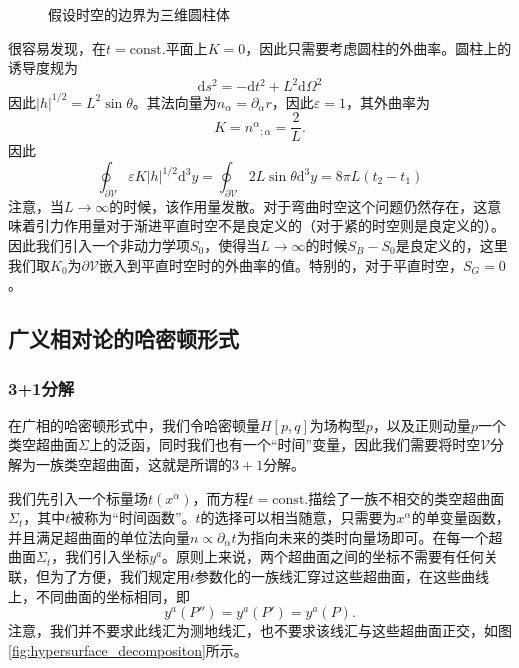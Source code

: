 \documentclass[hyperref, UTF8, a4paper]{ctexart}
\begin{document}
\begin{figure}
	\centering
	
	\caption{假设时空的边界为三维圆柱体}
	\label{nondynamical term example}
\end{figure}

很容易发现，在$t=\mathrm{const.}$平面上$K=0$，因此只需要考虑圆柱的外曲率。圆柱上的诱导度规为
\begin{equation*}
	\mathrm{d} s^{2} =-\mathrm{d} t^{2} +L^{2}\mathrm{d} \Omega^{2}
\end{equation*}
因此$| h| ^{1/2} =L^{2}\sin \theta $。其法向量为$n_{\alpha } =\partial _{\alpha } r$，因此$\varepsilon =1$，其外曲率为
\begin{equation*}
	K=n^{\alpha }{}_{;\alpha } =\frac{2}{L} .
\end{equation*}
因此
\begin{equation*}
	\oint _{\partial \mathscr{V}} \varepsilon K| h| ^{1/2}\mathrm{d}^{3} y=\oint _{\partial \mathscr{V}} 2L\sin \theta \mathrm{d}^{3} y=8\pi L( t_{2} -t_{1})
\end{equation*}
注意，当$L\rightarrow \infty $的时候，该作用量发散。对于弯曲时空这个问题仍然存在，这意味着引力作用量对于渐进平直时空不是良定义的（对于紧的时空则是良定义的）。因此我们引入一个非动力学项$S_{0}$，使得当$L\rightarrow \infty $的时候$S_{B} -S_{0}$是良定义的，这里我们取$K_{0}$为$\partial \mathscr{V}$嵌入到平直时空时的外曲率的值。特别的，对于平直时空，$S_{G} =0$。


\subsection{广义相对论的哈密顿形式}
\subsubsection{3+1分解}

在广相的哈密顿形式中，我们令哈密顿量$H[ p,q]$为场构型$p$，以及正则动量$p$一个类空超曲面$\Sigma $上的泛函，同时我们也有一个“时间”变量，因此我们需要将时空$\mathscr{V}$分解为一族类空超曲面，这就是所谓的$3+1$分解。



我们先引入一个标量场$t(x^{\alpha } )$，而方程$t=\mathrm{const.}$描绘了一族不相交的类空超曲面$\Sigma _{t}$，其中$t$被称为“时间函数”。$t$的选择可以相当随意，只需要为$x^{\alpha }$的单变量函数，并且满足超曲面的单位法向量$n\varpropto \partial _{\alpha } t$为指向未来的类时向量场即可。在每一个超曲面$\Sigma _{t}$，我们引入坐标$y^{a}$。原则上来说，两个超曲面之间的坐标不需要有任何关联，但为了方便，我们规定用$t$参数化的一族线汇穿过这些超曲面，在这些曲线上，不同曲面的坐标相同，即
\begin{equation*}
	y^{a}( P'') =y^{a} (P' )=y^{a}( P) .
\end{equation*}
注意，我们并不要求此线汇为测地线汇，也不要求该线汇与这些超曲面正交，如图\ref{fig:hypersurface_decompositon}所示。
\end{document}
